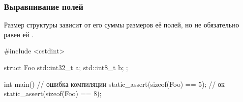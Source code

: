 \documentclass[compress, 8pt]{beamer}
\begin{document}
\begin{frame}[fragile]

    \frametitle{Выравнивание полей}

    Размер структуры зависит от его суммы размеров её полей, но не обязательно равен ей
    \footnotemark{}.

    \begin{myinplacelisting}[minted language=cpp]
#include <cstdint>

struct Foo {
    std::int32_t a;
    std::int8_t b;
};

int main() {
    // ошибка компиляции
    static_assert(sizeof(Foo) == 5);
    // ок
    static_assert(sizeof(Foo) == 8);
}
    \end{myinplacelisting}


\end{frame}
\end{document}
